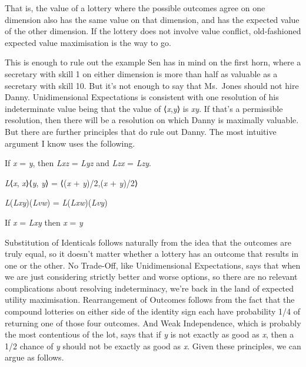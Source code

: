 \documentclass[
  10.5pt,
  twoside]{article}
\providecommand{\tightlist}{%
  \setlength{\itemsep}{0pt}\setlength{\parskip}{0pt}}
\let\olddescription\description
\let\endolddescription\enddescription
\renewenvironment{description}
  {\vskip 5pt\olddescription}
  {\endolddescription\vskip 5pt}
\begin{document}
That is, the value of a lottery where the possible outcomes agree on one
dimension also has the same value on that dimension, and has the
expected value of the other dimension. If the lottery does not involve
value conflict, old-fashioned expected value maximisation is the way to
go.

This is enough to rule out the example Sen has in mind on the first
horn, where a secretary with skill 1 on either dimension is more than
half as valuable as a secretary with skill 10. But it's not enough to
say that Ms.~Jones should not hire Danny. Unidimensional Expectations is
consistent with one resolution of his indeterminate value being that the
value of ⟨\emph{x},\emph{y}⟩ is \emph{xy}. If that's a permissible
resolution, then there will be a resolution on which Danny is maximally
valuable. But there are further principles that do rule out Danny. The
most intuitive argument I know uses the following.

\begin{description}
\tightlist
\item[Substitution of Identicals (SI)]
If \emph{x} = \emph{y}, then \emph{Lxz} = \emph{Lyz} and \emph{Lzx} =
\emph{Lzy}.
\item[No Trade-Off (NT)]
\emph{L}⟨\emph{x}, \emph{x}⟩⟨\emph{y}, \emph{y}⟩ = ⟨(\emph{x} +
\emph{y})/2,(\emph{x} + \emph{y})/2⟩
\item[Rearrangement of Outcomes (RO)]
\emph{L}(\emph{Lxy})(\emph{Lvw}) = \emph{L}(\emph{Lxw})(\emph{Lvy})
\item[Weak Independence (WI)]
If \emph{x} = \emph{Lxy} then \emph{x} = \emph{y}
\end{description}

Substitution of Identicals follows naturally from the idea that the
outcomes are truly equal, so it doesn't matter whether a lottery has an
outcome that results in one or the other. No Trade-Off, like
Unidimensional Expectations, says that when we are just considering
strictly better and worse options, so there are no relevant
complications about resolving indeterminacy, we're back in the land of
expected utility maximisation. Rearrangement of Outcomes follows from
the fact that the compound lotteries on either side of the identity sign
each have probability 1/4 of returning one of those four outcomes. And
Weak Independence, which is probably the most contentious of the lot,
says that if \emph{y} is not exactly as good as \emph{x}, then a 1/2
chance of \emph{y} should not be exactly as good as \emph{x}. Given
these principles, we can argue as follows.
\end{document}
